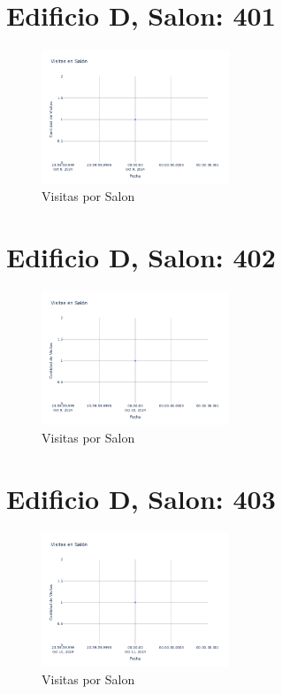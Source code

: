 \documentclass{article}
\begin{document}
    

    \section{Edificio D, Salon: 401}
    \begin{figure}
        \centering
        \includegraphics[width=0.5\textwidth]{../img/poli/VS401-90Dias-03-12-2024.png}
        \caption{Visitas por Salon}
    \end{figure}

    

    \section{Edificio D, Salon: 402}
    \begin{figure}
        \centering
        \includegraphics[width=0.5\textwidth]{../img/poli/VS402-90Dias-03-12-2024.png}
        \caption{Visitas por Salon}
    \end{figure}

    

    \section{Edificio D, Salon: 403}
    \begin{figure}
        \centering
        \includegraphics[width=0.5\textwidth]{../img/poli/VS403-90Dias-03-12-2024.png}
        \caption{Visitas por Salon}
    \end{figure}
\end{document}
